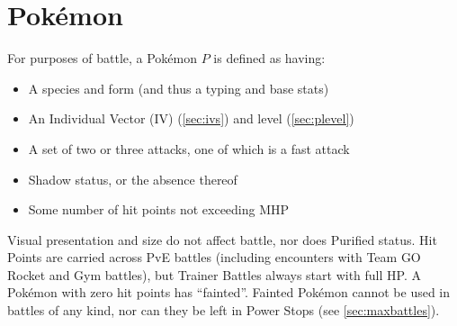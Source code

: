 \chapter{Pokémon}
\label{chap:pokemon}
For purposes of battle, a Pokémon $P$ is defined as having:
\begin{itemize}
\item A species and form (and thus a typing and base stats)
\item An Individual Vector (IV) (\autoref{sec:ivs}) and level (\autoref{sec:plevel})
\item A set of two or three attacks, one of which is a fast attack
\item Shadow status, or the absence thereof
\item Some number of hit points not exceeding MHP
\end{itemize}
Visual presentation and size do not affect battle, nor does Purified status.
Hit Points are carried across PvE battles (including encounters with
  Team GO Rocket and Gym battles), but Trainer Battles always start with full HP\@.
A Pokémon with zero hit points has ``fainted''.
Fainted Pokémon cannot be used in battles of any kind, nor can they be left in
 Power Stops (see \autoref{sec:maxbattles}).

